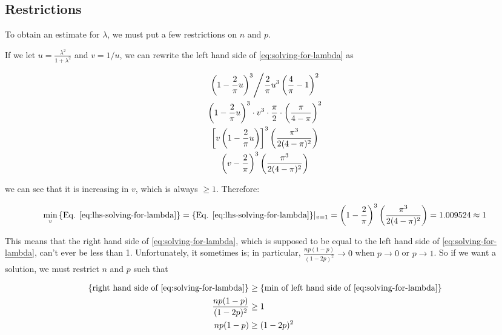 \documentclass{article}
\begin{document}
\subsection{Restrictions}

To obtain an estimate for $\lambda$, we must put a few restrictions on $n$ and
$p$.

If we let $u = \frac{\lambda^2}{1+\lambda^2}$ and $v = 1/u$, we can rewrite the
left hand side of \eqref{eq:solving-for-lambda} as

\begin{gather}
  \left. \left( 1 - \frac{2}{\pi} u \right)^3 \middle/ \frac{2}{\pi} u^3 \left( \frac{4}{\pi} - 1 \right)^2 \right. \nonumber \\
  \left( 1 - \frac{2}{\pi} u \right)^3 \cdot v^3 \cdot \frac{\pi}{2} \cdot \left( \frac{\pi}{4-\pi} \right)^2 \nonumber \\
  \left[ v \left( 1 - \frac{2}{\pi} u \right) \right]^3 \left( \frac{\pi^3}{2(4-\pi)^2} \right) \nonumber \\
  \left( v - \frac{2}{\pi} \right)^3 \left( \frac{\pi^3}{2(4-\pi)^2} \right) \label{eq:lhs-solving-for-lambda}
\end{gather}

we can see that it is increasing in $v$, which is always $\geq 1$. Therefore:

\begin{equation}
  \min_{v} \textnormal{\{Eq. \ref{eq:lhs-solving-for-lambda}\}} = \textnormal{\{Eq. \ref{eq:lhs-solving-for-lambda}\}} |_{v=1} = 
  \left( 1 - \frac{2}{\pi} \right)^3 \left( \frac{\pi^3}{2(4-\pi)^2} \right) = 1.009524 \approx 1
\end{equation}

This means that the right hand side of \eqref{eq:solving-for-lambda}, which is
supposed to be equal to the left hand side of \eqref{eq:solving-for-lambda},
can't ever be less than 1. Unfortunately, it sometimes is; in particular,
$\frac{np(1-p)}{(1-2p)^2} \to 0$ when $p \to 0$ or $p \to 1$. So if we want a
solution, we must restrict $n$ and $p$ such that

\begin{align}
  \textnormal{\{right hand side of \eqref{eq:solving-for-lambda}\}} &\geq \textnormal{\{min of left hand side of \eqref{eq:solving-for-lambda}\}} \nonumber \\
  \frac{np(1-p)}{(1-2p)^2} &\geq 1 \nonumber \\
  np(1-p) &\geq (1-2p)^2 \label{eq:solving-the-restriction}
\end{align}
\end{document}
